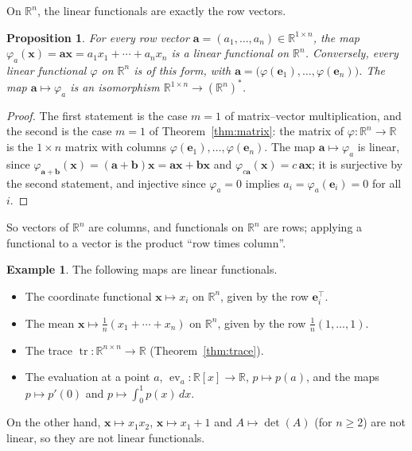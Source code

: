 \documentclass[11pt]{article}
\theoremstyle{definition}
\newtheorem{example}[definition]{Example}
\theoremstyle{plain}
\newtheorem{proposition}[definition]{Proposition}
\theoremstyle{remark}
\DeclareMathOperator{\tr}{tr}
\begin{document}
On $\mathbb{R}^n$, the linear functionals are exactly the row vectors.

\begin{proposition}\label{prop:functionals-rn}
    For every row vector $\mathbf{a} = (a_1, \ldots, a_n) \in \mathbb{R}^{1 \times n}$, the map $\varphi_a(\mathbf{x}) = \mathbf{a}\mathbf{x} = a_1 x_1 + \cdots + a_n x_n$ is a linear functional on $\mathbb{R}^n$. Conversely, every linear functional $\varphi$ on $\mathbb{R}^n$ is of this form, with $\mathbf{a} = \big(\varphi(\mathbf{e}_1), \ldots, \varphi(\mathbf{e}_n)\big)$. The map $\mathbf{a} \mapsto \varphi_a$ is an isomorphism $\mathbb{R}^{1 \times n} \to (\mathbb{R}^n)^*$.
\end{proposition}

\begin{proof}
    The first statement is the case $m = 1$ of matrix--vector multiplication, and the second is the case $m = 1$ of Theorem~\ref{thm:matrix}: the matrix of $\varphi: \mathbb{R}^n \to \mathbb{R}$ is the $1 \times n$ matrix with columns $\varphi(\mathbf{e}_1), \ldots, \varphi(\mathbf{e}_n)$. The map $\mathbf{a} \mapsto \varphi_a$ is linear, since $\varphi_{\mathbf{a} + \mathbf{b}}(\mathbf{x}) = (\mathbf{a} + \mathbf{b})\mathbf{x} = \mathbf{a}\mathbf{x} + \mathbf{b}\mathbf{x}$ and $\varphi_{c\mathbf{a}}(\mathbf{x}) = c\,\mathbf{a}\mathbf{x}$; it is surjective by the second statement, and injective since $\varphi_a = 0$ implies $a_i = \varphi_a(\mathbf{e}_i) = 0$ for all $i$.
\end{proof}

So vectors of $\mathbb{R}^n$ are columns, and functionals on $\mathbb{R}^n$ are rows; applying a functional to a vector is the product ``row times column''.

\begin{example}\label{ex:functionals}
    The following maps are linear functionals.
    \begin{itemize}
        \item The coordinate functional $\mathbf{x} \mapsto x_i$ on $\mathbb{R}^n$, given by the row $\mathbf{e}_i^\top$.
        \item The mean $\mathbf{x} \mapsto \frac{1}{n}(x_1 + \cdots + x_n)$ on $\mathbb{R}^n$, given by the row $\frac{1}{n}(1, \ldots, 1)$.
        \item The trace $\tr: \mathbb{R}^{n \times n} \to \mathbb{R}$ (Theorem~\ref{thm:trace}).
        \item The evaluation at a point $a$, $\operatorname{ev}_a: \mathbb{R}[x] \to \mathbb{R}$, $p \mapsto p(a)$, and the maps $p \mapsto p'(0)$ and $p \mapsto \int_0^1 p(x)\, dx$.
    \end{itemize}
    On the other hand, $\mathbf{x} \mapsto x_1 x_2$, $\mathbf{x} \mapsto x_1 + 1$ and $A \mapsto \det(A)$ (for $n \geq 2$) are not linear, so they are not linear functionals.
\end{example}
\end{document}
